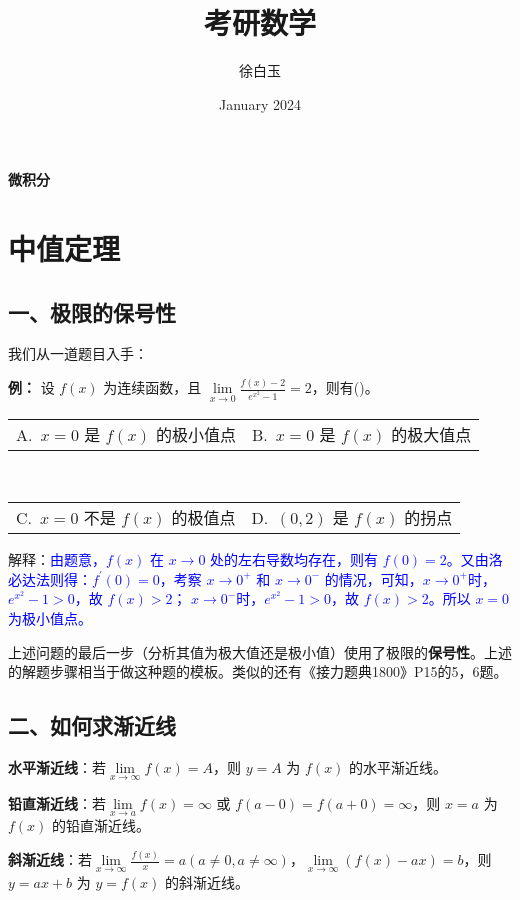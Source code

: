 \documentclass[b5paper]{ctexart}
\title{考研数学}
\author{徐白玉}
\date{January 2024}
\makeatletter
\newcommand{\twp} [4] { \\
	\begin{tabular} {*{2}{@{}p{7cm}}}
		A.~#1 & B.~#2
	\end{tabular} \\
	\begin{tabular} {*{2}{@{}p{7cm}}}
		C.~#3 & D.~#4
	\end{tabular}
}
\makeatother
\begin{document}
	\maketitle
	\thispagestyle{empty}
	\newpage
	\setcounter{page}{1}
	\tableofcontents
	
	\newpage
	\thispagestyle{empty}
	\begin{center}
		\parbox[c][\textheight][c]{1cm}{\centering\fontsize{40}{36}\selectfont\textbf{微积分}}
	\end{center}
	
	\newpage
	\setcounter{page}{1}
	
	\section{中值定理}
	\subsection*{一、极限的保号性}
	我们从一道题目入手：
	
	\textbf{例：} 设 $f(x)$ 为连续函数，且 $\lim\limits_{x \to 0} \frac{f(x) - 2}{e^{x^2} - 1} = 2$，则有(\quad)。
	\twp{$x = 0$ 是 $f(x)$ 的极小值点}{$x = 0$ 是 $f(x)$ 的极大值点\\}{$x = 0$ 不是 $f(x)$ 的极值点}{$(0, 2)$ 是 $f(x)$ 的拐点}
	
	解释：{\kaishu \textcolor{blue}{由题意，$f(x)$ 在 $x \to 0$ 处的左右导数均存在，则有 $f(0) = 2$。又由洛必达法则得：$f^{'}(0) = 0$，考察 $x \to 0^+$ 和 $x \to 0^-$ 的情况，可知，$x \to 0^+$时，$e^{x^2} - 1 > 0$，故 $f(x) > 2$； $x \to 0^-$时，$e^{x^2} - 1 > 0$，故 $f(x) > 2$。所以 $x = 0$ 为极小值点。}}
	
	上述问题的最后一步（分析其值为极大值还是极小值）使用了极限的\textbf{保号性}。上述的解题步骤相当于做这种题的模板。类似的还有《接力题典1800》P15的5，6题。
	
	\subsection*{二、如何求渐近线}
	\textbf{水平渐近线}：若$\lim\limits_{x \to \infty} f(x) = A$，则 $y = A$ 为 $f(x)$ 的水平渐近线。
	
	\textbf{铅直渐近线}：若$\lim\limits_{x \to a} f(x) = \infty$ 或 $f(a - 0) = f(a + 0) = \infty$，则 $x = a$ 为 $f(x)$ 的铅直渐近线。
	
	\textbf{斜渐近线}：若$\lim\limits_{x \to \infty} \frac{f(x)}{x} = a(a \ne 0, a \ne \infty)$，$\lim\limits_{x \to \infty} (f(x) - ax) = b$，则$y = ax + b$ 为 $y = f(x)$ 的斜渐近线。
	
\end{document}

